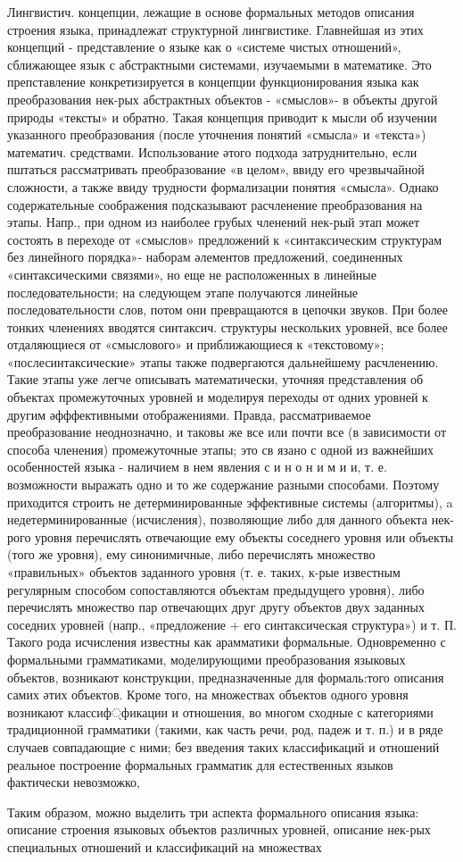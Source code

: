 \documentclass[10pt]{article}
\begin{document}
Лингвистич. концепции, лежащие в основе формальных методов описания строения языка, принадлежат структурной лингвистике. Главнейшая из этих концепций - представление о языке как о «системе чистых отношений», сближающее язык с абстрактными системами, изучаемыми в математике. Это препставление конкретизируется в концепции функционирования языка как преобразования нек-рых абстрактных объектов - «смыслов»- в объекты другой природы «тексты» и обратно. Такая концепция приводит к мысли об изучении указанного преобразования (после уточнения понятий «смысла» и «текста») математич. средствами. Использование әтого подхода затруднительно, если пштаться рассматривать преобразование «в целом», ввиду его чрезвычайной сложности, а также ввиду трудности формализации понятия «смысла». Однако содержательные соображения подсказывают расчленение преобразования на этапы. Напр., при одном из наиболее грубых членений нек-рый этап может состоять в переходе от «смыслов» предложений к «синтаксическим структурам без линейного порядка»- наборам әлементов предложений, соединенных «синтаксическими связями», но еще не расположенных в линейные последовательности; на следующем этапе получаются линейные последовательности слов, потом они превращаются в цепочки звуков. При более тонких членениях вводятся синтаксич. структуры нескольких уровней, все более отдаляющиеся от «смыслового» и приближающиеся к «текстовому»; «послесинтаксические» этапы также подвергаются дальнейшему расчленению. Такие этапы уже легче описывать математически, уточняя представления об объектах промежуточных уровней и моделируя переходы от одних уровней к другим әфффективными отображениями. Правда, рассматриваемое преобразование неоднозначно, и таковы же все или почти все (в зависимости от способа членения) промежуточные этапы; это св язано с одной из важнейших особенностей языка - наличием в нем явления с и н о н и м и и, т. е. возможности выражать одно и то же содержание разными способами. Поэтому приходится строить не детерминированные эффективные системы (алгоритмы), a недетерминированные (исчисления), позволяющие либо для данного объекта нек-рого уровня перечислять отвечающие ему объекты соседнего уровня или объекты (того же уровня), ему синонимичные, либо перечислять множество «правильных» объектов заданного уровня (т. е. таких, к-рые известным регулярным способом сопоставляются объектам предыдущего уровня), либо перечислять множество пар отвечающих друг другу объектов двух заданных соседних уровней (напр., «предложение + его синтаксическая структура») и т. П. Такого рода исчисления известны как арамматики формальные. Одновременно с формальными грамматиками, моделирующими преобразования языковых объектов, возникают конструкции, предназначенные для формаль:того описания самих әтих объектов. Кроме того, на множествах объектов одного уровня возникают классиф্фикации и отношения, во многом сходные с категориями традиционной грамматики (такими, как часть речи, род, падеж и т. п.) и в ряде случаев совпадающие с ними; без введения таких классификаций и отношений реальное построение формальных грамматик для естественных языков фактически невозможко,



Таким образом, можно выделить три аспекта формального описания языка: описание строения языковых объектов различных уровней, описание нек-рых специальных отношений и классификаций на множествах
\end{document}
